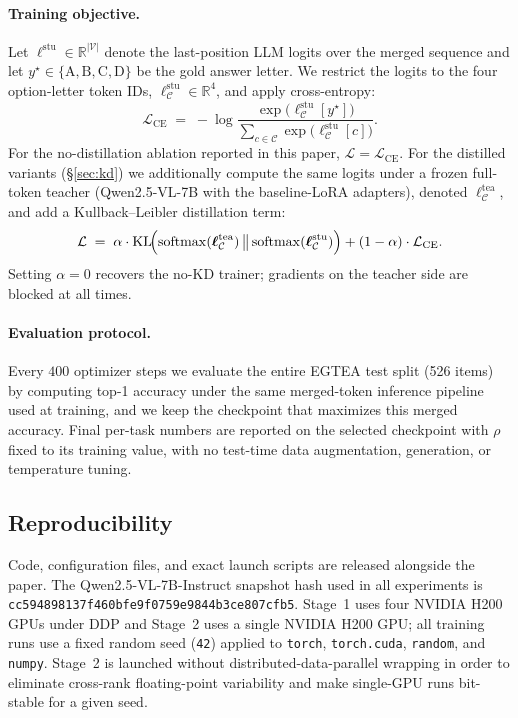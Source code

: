 \paragraph{Training objective.}
Let $\boldsymbol{\ell}^{\text{stu}} \in \mathbb{R}^{|\mathcal{V}|}$ denote
the last-position LLM logits over the merged sequence and let
$y^\star \in \{\text{A},\text{B},\text{C},\text{D}\}$ be the gold answer
letter. We restrict the logits to the four option-letter token IDs,
$\boldsymbol{\ell}^{\text{stu}}_{\mathcal{C}} \in \mathbb{R}^{4}$, and apply
cross-entropy:
\begin{equation}
    \mathcal{L}_\text{CE}
    \;=\; -\log
    \frac{\exp\!\bigl(\boldsymbol{\ell}^{\text{stu}}_{\mathcal{C}}[y^\star]\bigr)}
         {\sum_{c\in\mathcal{C}} \exp\!\bigl(\boldsymbol{\ell}^{\text{stu}}_{\mathcal{C}}[c]\bigr)} .
    \label{eq:ce}
\end{equation}
For the no-distillation ablation reported in this paper,
$\mathcal{L} = \mathcal{L}_\text{CE}$. For the distilled variants
(\S\ref{sec:kd}) we additionally compute the same logits under a frozen
full-token teacher (Qwen2.5-VL-7B with the baseline-LoRA adapters), denoted
$\boldsymbol{\ell}^{\text{tea}}_{\mathcal{C}}$, and add a Kullback--Leibler
distillation term:
\begin{equation}
    \mathcal{L}
    \;=\; \alpha \cdot
    \mathrm{KL}\!\Bigl(
        \mathrm{softmax}(\boldsymbol{\ell}^{\text{tea}}_{\mathcal{C}})
        \,\big\|\,
        \mathrm{softmax}(\boldsymbol{\ell}^{\text{stu}}_{\mathcal{C}})
    \Bigr)
    + (1-\alpha)\cdot \mathcal{L}_\text{CE} .
    \label{eq:kd}
\end{equation}
Setting $\alpha{=}0$ recovers the no-KD trainer; gradients on the teacher
side are blocked at all times.

\paragraph{Evaluation protocol.}
Every $400$ optimizer steps we evaluate the entire EGTEA test split
(526 items) by computing top-1 accuracy under the same merged-token
inference pipeline used at training, and we keep the checkpoint that
maximizes this merged accuracy. Final per-task numbers are reported on the
selected checkpoint with $\rho$ fixed to its training value, with no
test-time data augmentation, generation, or temperature tuning.

\subsection{Reproducibility}
\label{sec:impl-repro}
Code, configuration files, and exact launch scripts are released alongside
the paper. The Qwen2.5-VL-7B-Instruct snapshot hash used in all experiments
is \texttt{cc594898137f460bfe9f0759e9844b3ce807cfb5}.
Stage~1 uses four NVIDIA H200 GPUs under DDP and Stage~2 uses a
single NVIDIA H200 GPU; all training runs use a fixed random seed
(\texttt{42}) applied to \texttt{torch}, \texttt{torch.cuda},
\texttt{random}, and \texttt{numpy}. Stage~2 is launched without
distributed-data-parallel wrapping in order to eliminate cross-rank
floating-point variability and make single-GPU runs bit-stable for a given
seed.